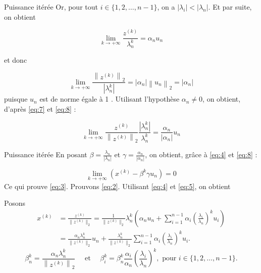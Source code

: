 \documentclass[french, 10pt]{beamer}
\theoremstyle{definition}
\begin{document}
\begin{frame}{Puissance itérée}
	Or, pour tout $i \in\{1,2, \ldots, n-1\}$, on a $\left|\lambda_i\right|<\left|\lambda_n\right|$. Et par suite, on obtient
		
\begin{equation}
    		\lim _{k \rightarrow+\infty} \frac{z^{(k)}}{\lambda_n^k}=\alpha_n u_n
            \label{eq:7}
\end{equation}
		
		et donc
		
\begin{equation}
    		\lim _{k \rightarrow+\infty} \frac{\left\|z^{(k)}\right\|_2}{\left|\lambda_n^k\right|}=\left|\alpha_n\right|\left\|u_n\right\|_2=\left|\alpha_n\right|
            \label{eq:8}
\end{equation}
        		puisque $u_n$ est de norme égale à 1 . Utilisant l'hypothèse $\alpha_n \neq 0$, on obtient, d'après \eqref{eq:7} et \eqref{eq:8} :
		
\begin{equation}
    		\lim _{k \rightarrow+\infty} \frac{z^{(k)}}{\left\|z^{(k)}\right\|_2} \frac{\left|\lambda_n^k\right|}{\lambda_n^k}=\frac{\alpha_n}{\left|\alpha_n\right|} u_n
            \label{eq:9}
\end{equation}
\end{frame}
\begin{frame}{Puissance itérée}
		En posant $\beta=\frac{\lambda_n}{\left|\lambda_n\right|}$ et $\gamma=\frac{\alpha_n}{\left|\alpha_n\right|}$, on obtient, grâce à \eqref{eq:4} et \eqref{eq:8} :
		
		$$
		\lim _{k \rightarrow+\infty}\left(x^{(k)}-\beta^k \gamma u_n\right)=0
		$$
		Ce qui prouve \eqref{eq:3}.
		Prouvons \eqref{eq:2}. Utilisant \eqref{eq:4} et \eqref{eq:5}, on obtient
        
       
		Posons
\begin{align}
	x^{(k)} &= \frac{z^{(k)}}{\|z^{(k)}\|_2} = \frac{1}{\|z^{(k)}\|_2} \lambda_n^k \left( \alpha_n u_n + \sum_{i=1}^{n-1} \alpha_i \left( \frac{\lambda_i}{\lambda_n} \right)^k u_i \right) \label{eq:5.22-first} \\
	&= \frac{\alpha_n \lambda_n^k}{\|z^{(k)}\|_2} u_n + \frac{\lambda_n^k}{\|z^{(k)}\|_2} \sum_{i=1}^{n-1} \alpha_i \left( \frac{\lambda_i}{\lambda_n} \right)^k u_i. \label{eq:5.22-second}
\end{align}		
\begin{equation}
    		\beta_n^k=\frac{\alpha_n \lambda_n^k}{\left\|z^{(k)}\right\|_2} \quad \text { et } \quad \beta_i^k=\beta_n^k \frac{\alpha_i}{\alpha_n}\left(\frac{\lambda_i}{\lambda_n}\right)^k, \text { pour } i \in\{1,2, \ldots, n-1\} .
            \hspace{0cm}\label{eq:11}
\end{equation}

\end{frame}
\end{document}

